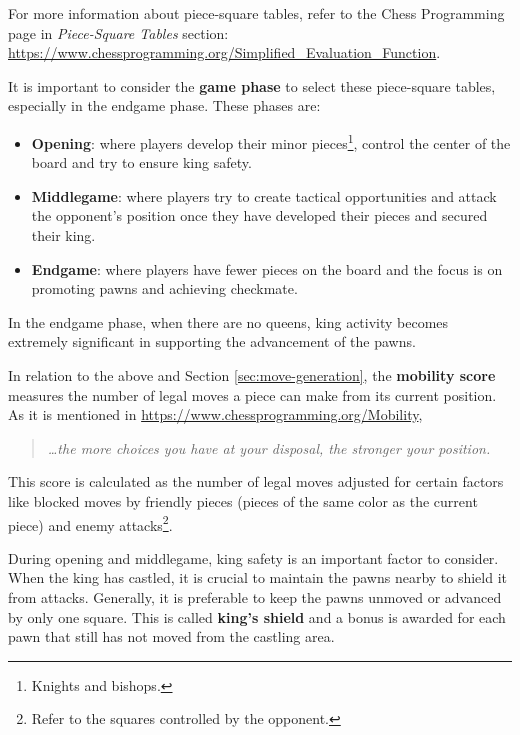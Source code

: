 \noindent For more information about piece-square tables, refer to the Chess Programming page in \textit{Piece-Square Tables} section: \url{https://www.chessprogramming.org/Simplified_Evaluation_Function}.

\vspace{1em}

\noindent It is important to consider the \textbf{game phase} to select these piece-square tables, especially in the endgame phase. These phases are:

\begin{itemize}
    \item \textbf{Opening}: where players develop their minor pieces\footnote{Knights and bishops.}, control the center of the board and try to ensure king safety.
    \item \textbf{Middlegame}: where players try to create tactical opportunities and attack the opponent's position once they have developed their pieces and secured their king.
    \item \textbf{Endgame}: where players have fewer pieces on the board and the focus is on promoting pawns and achieving checkmate.
\end{itemize}

\noindent In the endgame phase, when there are no queens, king activity becomes extremely significant in supporting the advancement of the pawns.

\vspace{1em}

\noindent In relation to the above and Section \ref{sec:move-generation}, the \textbf{mobility score} measures the number of legal moves a piece can make from its current position. As it is mentioned in \url{https://www.chessprogramming.org/Mobility},
\begin{quotation}
\textit{\dots the more choices you have at your disposal, the stronger your position.}
\end{quotation} This score is calculated as the number of legal moves adjusted for certain factors like blocked moves by friendly pieces (pieces of the same color as the current piece) and enemy attacks\footnote{Refer to the squares controlled by the opponent.}.

\vspace{1em}

\noindent During opening and middlegame, king safety is an important factor to consider. When the king has castled, it is crucial to maintain the pawns nearby to shield it from attacks. Generally, it is preferable to keep the pawns unmoved or advanced by only one square. This is called \textbf{king's shield} and a bonus is awarded for each pawn that still has not moved from the castling area.

